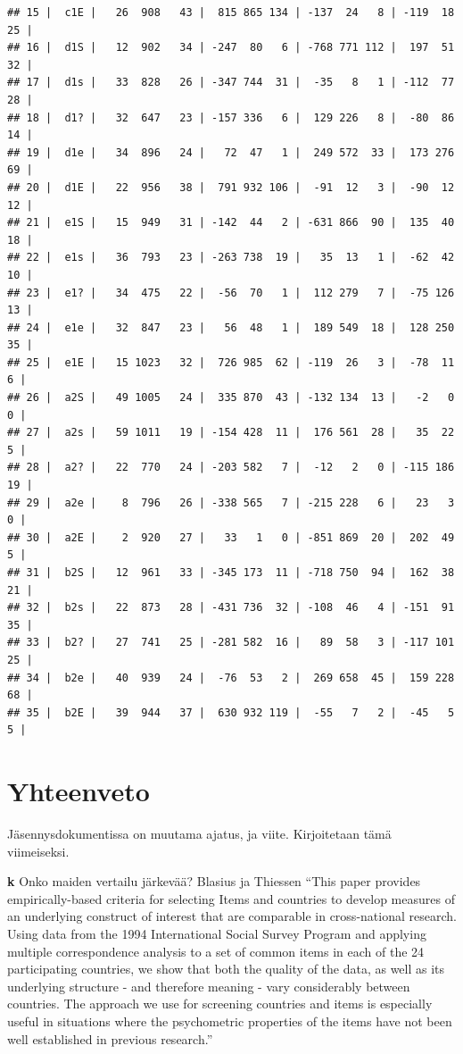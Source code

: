 \documentclass[
  finnish,
]{book}
\begin{document}
\begin{verbatim}
## 15 |  c1E |   26  908   43 |  815 865 134 | -137  24   8 | -119  18  25 |
## 16 |  d1S |   12  902   34 | -247  80   6 | -768 771 112 |  197  51  32 |
## 17 |  d1s |   33  828   26 | -347 744  31 |  -35   8   1 | -112  77  28 |
## 18 |  d1? |   32  647   23 | -157 336   6 |  129 226   8 |  -80  86  14 |
## 19 |  d1e |   34  896   24 |   72  47   1 |  249 572  33 |  173 276  69 |
## 20 |  d1E |   22  956   38 |  791 932 106 |  -91  12   3 |  -90  12  12 |
## 21 |  e1S |   15  949   31 | -142  44   2 | -631 866  90 |  135  40  18 |
## 22 |  e1s |   36  793   23 | -263 738  19 |   35  13   1 |  -62  42  10 |
## 23 |  e1? |   34  475   22 |  -56  70   1 |  112 279   7 |  -75 126  13 |
## 24 |  e1e |   32  847   23 |   56  48   1 |  189 549  18 |  128 250  35 |
## 25 |  e1E |   15 1023   32 |  726 985  62 | -119  26   3 |  -78  11   6 |
## 26 |  a2S |   49 1005   24 |  335 870  43 | -132 134  13 |   -2   0   0 |
## 27 |  a2s |   59 1011   19 | -154 428  11 |  176 561  28 |   35  22   5 |
## 28 |  a2? |   22  770   24 | -203 582   7 |  -12   2   0 | -115 186  19 |
## 29 |  a2e |    8  796   26 | -338 565   7 | -215 228   6 |   23   3   0 |
## 30 |  a2E |    2  920   27 |   33   1   0 | -851 869  20 |  202  49   5 |
## 31 |  b2S |   12  961   33 | -345 173  11 | -718 750  94 |  162  38  21 |
## 32 |  b2s |   22  873   28 | -431 736  32 | -108  46   4 | -151  91  35 |
## 33 |  b2? |   27  741   25 | -281 582  16 |   89  58   3 | -117 101  25 |
## 34 |  b2e |   40  939   24 |  -76  53   2 |  269 658  45 |  159 228  68 |
## 35 |  b2E |   39  944   37 |  630 932 119 |  -55   7   2 |  -45   5   5 |
\end{verbatim}

\hypertarget{yhteenveto}{%
\chapter{Yhteenveto}\label{yhteenveto}}

Jäsennysdokumentissa on muutama ajatus, ja viite. Kirjoitetaan tämä viimeiseksi.

\textbf{k} Onko maiden vertailu järkevää?
Blasius ja Thiessen
``This paper provides empirically-based criteria for selecting Items and countries
to develop measures of an underlying construct of interest that are comparable in
cross-national research. Using data from the 1994 International Social Survey
Program and applying multiple correspondence analysis to a set of common items
in each of the 24 participating countries, we show that both the quality of the
data, as well as its underlying structure - and therefore meaning - vary
considerably between countries. The approach we use for screening countries and
items is especially useful in situations where the psychometric properties of
the items have not been well established in previous research.''
\citep{RefWorks:doc:5b15542ee4b0e2616bc42dca}
\end{document}
